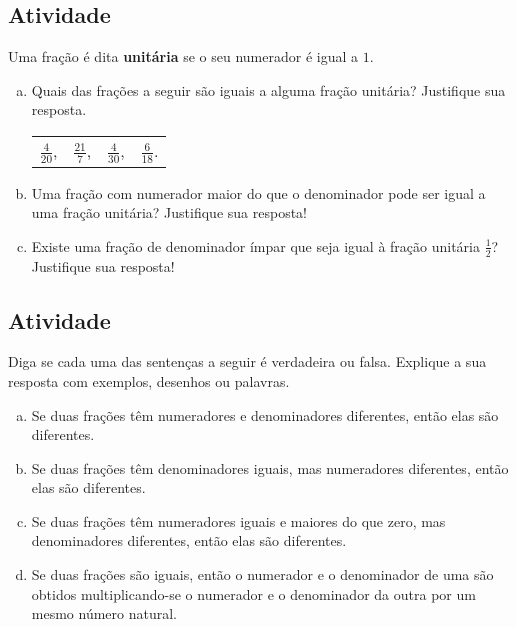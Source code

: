 \documentclass[a4,12pt]{book}
\begin{document}
\subsection{Atividade}

Uma fração é dita {\bf unitária} se o seu numerador é igual a $1$. 
\begin{enumerate}[a)]
\item  Quais das frações a seguir são iguais a alguma fração unitária? Justifique sua resposta.

\begin{center}
\begin{tabular}{m{}m{}m{}m{}}
$\frac{4}{20}$, & $\frac{21}{7}$, & $\frac{4}{30}$, & $\frac{6}{18}$.
\end{tabular}
\end{center}

\item  Uma fração com numerador maior do que o denominador pode ser igual a uma fração unitária? Justifique sua resposta!

\item  Existe uma fração de denominador ímpar que seja igual à fração unitária $\frac{1}{2}$? Justifique sua resposta! 
\end{enumerate}

\subsection{Atividade}

Diga se cada uma das sentenças a seguir é verdadeira ou falsa. Explique a sua resposta com exemplos, desenhos ou palavras.
\begin{enumerate}[a)]
 \item  Se duas frações têm numeradores e denominadores diferentes, então elas são diferentes.
 \item Se duas frações têm denominadores iguais, mas numeradores diferentes, então elas são diferentes.
 \item Se duas frações têm numeradores iguais e maiores do que zero, mas denominadores diferentes, então elas são diferentes.
 \item Se duas frações são iguais, então o numerador e o denominador de uma são obtidos multiplicando-se o numerador e o denominador da outra por um mesmo número natural.
\end{enumerate}
\end{document}
